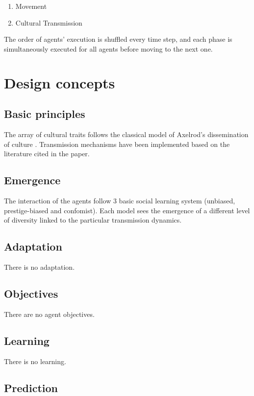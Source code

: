 \documentclass[11pt,a4paper,twocolumn,notitlepage]{article}
\begin{document}
\begin{enumerate}
\item{Movement}
\item{Cultural Transmission}
\end{enumerate}

The order of agents' execution is shuffled every time step, and each phase is simultaneously executed for all agents before moving to the next one.


\section{Design concepts}

\subsection{Basic principles}

The array of cultural traits follows the classical model of Axelrod's dissemination of culture \citep{axelrod_1997}. Transmission mechanisms have been implemented based on the literature cited in the paper.

\subsection{Emergence}

The interaction of the agents follow 3 basic social learning system (unbiased, prestige-biased and confomist). Each model sees the emergence of a different level of diversity linked to the particular transmission dynamics. 

\subsection{Adaptation}

There is no adaptation.

\subsection{Objectives}

There are no agent objectives.

\subsection{Learning}

There is no learning.

\subsection{Prediction}
\end{document}
